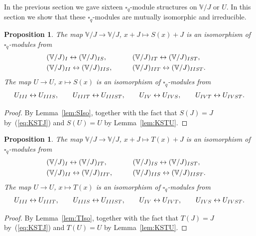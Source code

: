 \documentclass[11pt]{article}
\numberwithin{equation}{section}
\numberwithin{equation}{section}
\newtheorem{Proposition}[Theorem]{Proposition}
 { \theoremstyle{definition}
\newtheorem{Definition}[Theorem]{Definition}
\newtheorem{Example}[Theorem]{Example}
\newtheorem{Note}[Theorem]{Note}
}
\begin{document}
{In the previous section we gave sixteen $\square_q$-module structures on $\mathbb V/J$ or $U$. In this section we show that these $\square_q$-modules are mutually isomorphic and irreducible.

\begin{Proposition}\label{prop:Smix} The map $\mathbb V/J\to \mathbb V/J$, $x+J\mapsto S(x)+J$ is an isomorphism of $\square_q$-modules from
\begin{alignat*}{3}
&(\mathbb V/J)_{\rm I} \leftrightarrow (\mathbb V/J)_{\rm IS}, \qquad &&
(\mathbb V/J)_{\rm IT} \leftrightarrow (\mathbb V/J)_{\rm IST},&\\
&(\mathbb V/J)_{\rm II} \leftrightarrow (\mathbb V/J)_{\rm IIS}, \qquad &&
(\mathbb V/J)_{\rm IIT} \leftrightarrow (\mathbb V/J)_{\rm IIST}.&
\end{alignat*}
The map $U \to U$, $x \mapsto S(x)$ is an isomorphism of $\square_q$-modules from
\begin{gather*}
U_{\rm III} \leftrightarrow U_{\rm IIIS}, \qquad
U_{\rm IIIT} \leftrightarrow U_{\rm IIIST}, \qquad
U_{\rm IV} \leftrightarrow U_{\rm IVS}, \qquad
U_{\rm IVT} \leftrightarrow U_{\rm IVST}.
\end{gather*}
\end{Proposition}
\begin{proof} By Lemma~\ref{lem:SIso}, together with the fact that $S(J)=J$ by~(\ref{eq:KSTJ}) and $S(U)=U$ by Lemma~\ref{lem:KSTU}.
\end{proof}

\begin{Proposition}\label{prop:Tmix}The map $\mathbb V/J\to \mathbb V/J$, $x+J\mapsto T(x)+J$ is an isomorphism of $\square_q$-modules from
\begin{alignat*}{3}
& (\mathbb V/J)_{\rm I} \leftrightarrow (\mathbb V/J)_{\rm IT}, \qquad &&
(\mathbb V/J)_{\rm IS} \leftrightarrow (\mathbb V/J)_{\rm IST},&\\
&(\mathbb V/J)_{\rm II} \leftrightarrow (\mathbb V/J)_{\rm IIT}, \qquad &&
(\mathbb V/J)_{\rm IIS} \leftrightarrow (\mathbb V/J)_{\rm IIST}.&
\end{alignat*}
The map $U \to U$, $x \mapsto T(x)$ is an isomorphism of $\square_q$-modules from
\begin{gather*}
 U_{\rm III} \leftrightarrow U_{\rm IIIT}, \qquad
U_{\rm IIIS} \leftrightarrow U_{\rm IIIST}, \qquad
U_{\rm IV} \leftrightarrow U_{\rm IVT}, \qquad
U_{\rm IVS} \leftrightarrow U_{\rm IVST}.
\end{gather*}
\end{Proposition}
\begin{proof} By Lemma~\ref{lem:TIso}, together with the fact that $T(J)=J$ by~(\ref{eq:KSTJ}) and $T(U)=U$ by Lemma~\ref{lem:KSTU}.
\end{proof}

}
\end{document}
